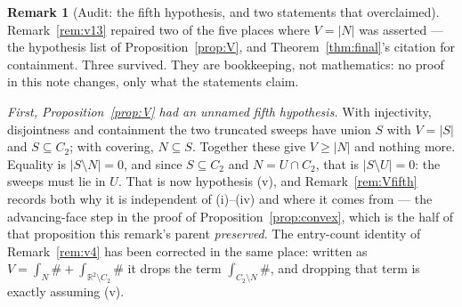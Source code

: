 \documentclass[11pt]{article}
\theoremstyle{definition}
\newtheorem{remark}[theorem]{Remark}
\newcommand{\R}{\mathbb{R}}
\begin{document}
\begin{remark}[Audit: the fifth hypothesis, and two statements that overclaimed]\label{rem:v34}
Remark~\ref{rem:v13} repaired two of the five places where $V=|N|$ was asserted --- the
hypothesis list of Proposition~\ref{prop:V}, and Theorem~\ref{thm:final}'s citation for
containment. Three survived. They are bookkeeping, not mathematics: no proof in this note
changes, only what the statements claim.

\emph{First, Proposition~\ref{prop:V} had an unnamed fifth hypothesis.} With injectivity,
disjointness and containment the two truncated sweeps have union $S$ with $V=|S|$ and
$S\subseteq C_2$; with covering, $N\subseteq S$. Together these give $V\ge|N|$ and nothing
more. Equality is $|S\setminus N|=0$, and since $S\subseteq C_2$ and $N=U\cap C_2$, that is
$|S\setminus U|=0$: the sweeps must lie in $U$. That is now hypothesis (v), and
Remark~\ref{rem:Vfifth} records both why it is independent of (i)--(iv) and where it comes
from --- the advancing-face step in the proof of Proposition~\ref{prop:convex}, which is
the half of that proposition this remark's parent \emph{preserved}. The entry-count identity
of Remark~\ref{rem:v4} has been corrected in the same place: written as
$V=\int_N\#+\int_{\R^2\setminus C_2}\#$ it drops the term $\int_{C_2\setminus N}\#$, and
dropping that term is exactly assuming (v).


\end{remark}
\end{document}
